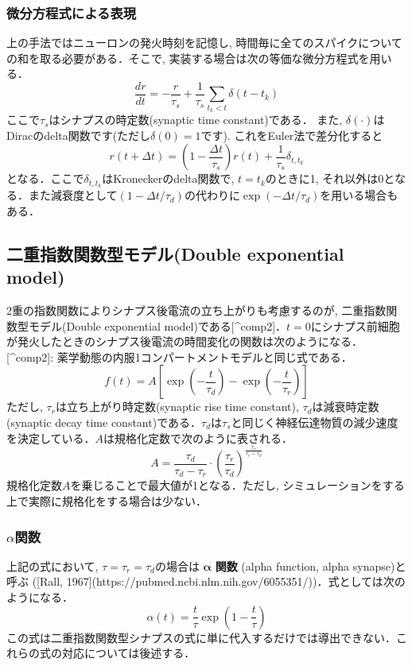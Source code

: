 \subsubsection{微分方程式による表現}
上の手法ではニューロンの発火時刻を記憶し, 時間毎に全てのスパイクについての和を取る必要がある．そこで, 実装する場合は次の等価な微分方程式を用いる．
\begin{equation}
\frac{dr}{dt}=-\frac{r}{\tau_{s}}+\frac{1}{\tau_{s}} \sum_{t_{k}< t} \delta\left(t-t_{k}\right)   
\end{equation}
ここで$\tau_s$はシナプスの時定数(synaptic time constant)である． また, $\delta(\cdot)$はDiracのdelta関数です(ただし$\delta(0)=1$です). これをEuler法で差分化すると 
\begin{equation}
r(t+\Delta t)=\left(1-\frac{\Delta t}{\tau_{s}}\right)r(t)+\frac{1}{\tau_{s}}\delta_{t,t_{k}} 
\end{equation}
となる．ここで$\delta_{t,t_{k}}$はKroneckerのdelta関数で, $t=t_{k}$のときに1, それ以外は0となる．また減衰度として$\left(1-\Delta  t/\tau_{d}\right)$の代わりに$\exp\left(-\Delta t/\tau_{d}\right)$を用いる場合もある．
\subsection{二重指数関数型モデル(Double exponential model)}
2重の指数関数によりシナプス後電流の立ち上がりも考慮するのが, 二重指数関数型モデル(Double exponential model)である[^comp2]．$t=0$にシナプス前細胞が発火したときのシナプス後電流の時間変化の関数は次のようになる．
[^comp2]: 薬学動態の内服1コンパートメントモデルと同じ式である．
\begin{equation}
f(t)=A\left[\exp\left(-\frac{t}{\tau_d}\right)-\exp\left(-\frac{t}{\tau_r}\right)\right]    
\end{equation}
ただし, ${\tau_r}$は立ち上がり時定数(synaptic rise time constant), ${\tau_d}$は減衰時定数(synaptic decay time constant)である．$\tau_{d}$は$\tau_{s}$と同じく神経伝達物質の減少速度を決定している．$A$は規格化定数で次のように表される．
\begin{equation}
A=\frac{\tau_d}{\tau_d-\tau_r}\cdot \left(\frac{\tau_r}{\tau_d}\right)^\frac{\tau_r}{\tau_r-\tau_d}    
\end{equation}
規格化定数$A$を乗じることで最大値が1となる．ただし, シミュレーションをする上で実際に規格化をする場合は少ない．
\subsubsection{$\alpha$関数}
上記の式において, $\tau=\tau_{r}=\tau_{d}$の場合は $\boldsymbol{\alpha}$ \textbf{関数} (alpha function, alpha synapse)と呼ぶ ([Rall, 1967](https://pubmed.ncbi.nlm.nih.gov/6055351/))．式としては次のようになる．
\begin{equation}
\alpha(t)=\frac{t}{\tau}\exp\left(1-\frac{t}{\tau}\right)    
\end{equation}
この式は二重指数関数型シナプスの式に単に代入するだけでは導出できない．これらの式の対応については後述する．
